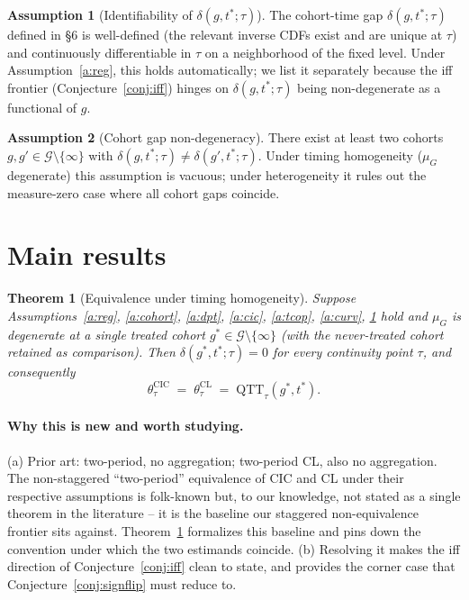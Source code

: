 \documentclass[11pt]{article}
\theoremstyle{definition}
\newtheorem{assumption}{Assumption}
\theoremstyle{plain}
\newtheorem{theorem}{Theorem}
\theoremstyle{remark}
\begin{document}
\begin{assumption}[Identifiability of $\delta(g, t^*; \tau)$]\label{a:idg}
The cohort-time gap $\delta(g, t^*; \tau)$ defined in \S6 is well-defined (the relevant inverse CDFs exist and are unique at $\tau$) and continuously differentiable in $\tau$ on a neighborhood of the fixed level. Under Assumption~\ref{a:reg}, this holds automatically; we list it separately because the iff frontier (Conjecture~\ref{conj:iff}) hinges on $\delta(g, t^*; \tau)$ being non-degenerate as a functional of $g$.
\end{assumption}

\begin{assumption}[Cohort gap non-degeneracy]\label{a:nondeg}
There exist at least two cohorts $g, g' \in \mathcal{G} \setminus \{\infty\}$ with $\delta(g, t^*; \tau) \ne \delta(g', t^*; \tau)$. Under timing homogeneity ($\mu_G$ degenerate) this assumption is vacuous; under heterogeneity it rules out the measure-zero case where all cohort gaps coincide.
\end{assumption}

\section{Main results}

\begin{theorem}[Equivalence under timing homogeneity]\label{thm:hom}
Suppose Assumptions~\ref{a:reg}, \ref{a:cohort}, \ref{a:dpt}, \ref{a:cic}, \ref{a:tcop}, \ref{a:curv}, \ref{a:idg} hold and $\mu_G$ is degenerate at a single treated cohort $g^* \in \mathcal{G} \setminus \{\infty\}$ (with the never-treated cohort retained as comparison). Then $\delta(g^*, t^*; \tau) = 0$ for every continuity point $\tau$, and consequently
\[
  \theta^{\mathrm{CIC}}_\tau \;=\; \theta^{\mathrm{CL}}_\tau \;=\; \mathrm{QTT}_\tau(g^*, t^*).
\]
\end{theorem}

\paragraph{Why this is new and worth studying.}
(a) Prior art: \cite{AtheyImbens2006} two-period, no aggregation; \cite{CallawayLi2019} two-period CL, also no aggregation. The non-staggered ``two-period'' equivalence of CIC and CL under their respective assumptions is folk-known but, to our knowledge, not stated as a single theorem in the literature -- it is the baseline our staggered non-equivalence frontier sits against. Theorem~\ref{thm:hom} formalizes this baseline and pins down the convention under which the two estimands coincide.
(b) Resolving it makes the iff direction of Conjecture~\ref{conj:iff} clean to state, and provides the corner case that Conjecture~\ref{conj:signflip} must reduce to.
\end{document}
